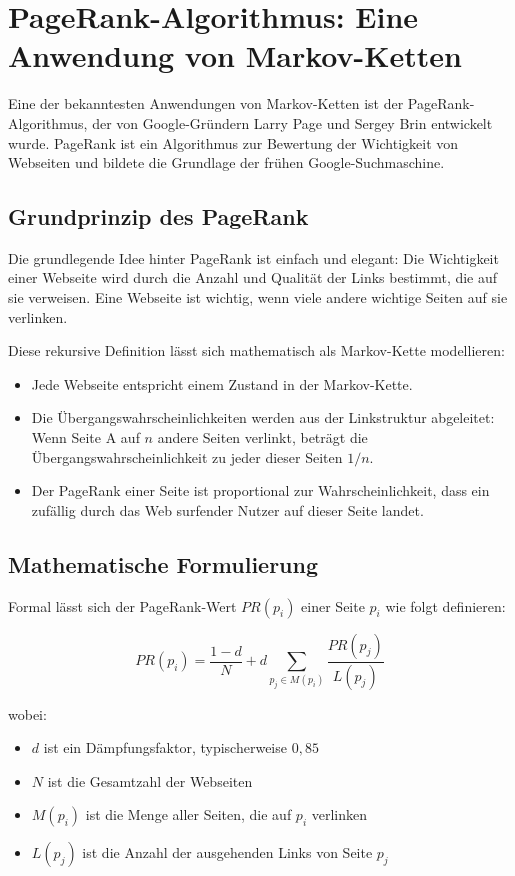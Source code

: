 \section{PageRank-Algorithmus: Eine Anwendung von Markov-Ketten}

Eine der bekanntesten Anwendungen von Markov-Ketten ist der PageRank-Algorithmus, der von Google-Gründern Larry Page und Sergey Brin entwickelt wurde. PageRank ist ein Algorithmus zur Bewertung der Wichtigkeit von Webseiten und bildete die Grundlage der frühen Google-Suchmaschine.

\subsection{Grundprinzip des PageRank}

Die grundlegende Idee hinter PageRank ist einfach und elegant: Die Wichtigkeit einer Webseite wird durch die Anzahl und Qualität der Links bestimmt, die auf sie verweisen. Eine Webseite ist wichtig, wenn viele andere wichtige Seiten auf sie verlinken.

Diese rekursive Definition lässt sich mathematisch als Markov-Kette modellieren:

\begin{itemize}
    \item Jede Webseite entspricht einem Zustand in der Markov-Kette.
    \item Die Übergangswahrscheinlichkeiten werden aus der Linkstruktur abgeleitet: Wenn Seite A auf $n$ andere Seiten verlinkt, beträgt die Übergangswahrscheinlichkeit zu jeder dieser Seiten $1/n$.
    \item Der PageRank einer Seite ist proportional zur Wahrscheinlichkeit, dass ein zufällig durch das Web surfender Nutzer auf dieser Seite landet.
\end{itemize}

\subsection{Mathematische Formulierung}

Formal lässt sich der PageRank-Wert $PR(p_i)$ einer Seite $p_i$ wie folgt definieren:

\[
    PR(p_i) = \frac{1-d}{N} + d \sum_{p_j \in M(p_i)} \frac{PR(p_j)}{L(p_j)}
\]

wobei:
\begin{itemize}
    \item $d$ ist ein Dämpfungsfaktor, typischerweise $0{,}85$
    \item $N$ ist die Gesamtzahl der Webseiten
    \item $M(p_i)$ ist die Menge aller Seiten, die auf $p_i$ verlinken
    \item $L(p_j)$ ist die Anzahl der ausgehenden Links von Seite $p_j$
\end{itemize}

